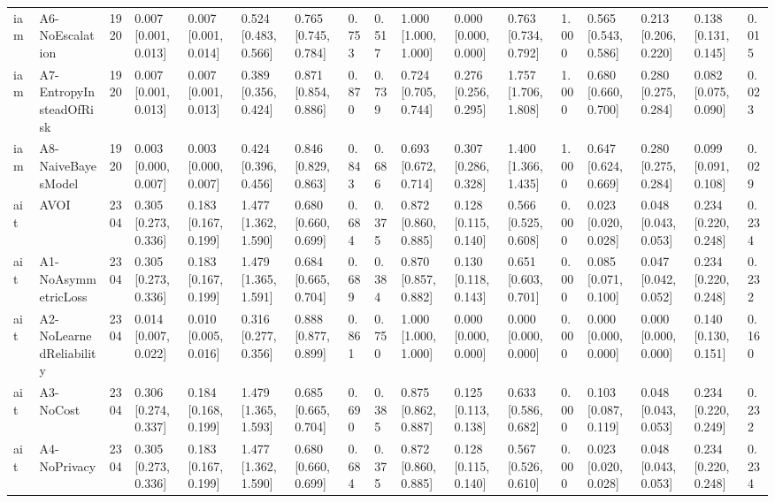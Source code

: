 \begin{table}[!ht]
{\begin{tabular}{lllllllllllllllll}
iam & A6-NoEscalation & 1920 & 0.007 [0.001, 0.013] & 0.007 [0.001, 0.014] & 0.524 [0.483, 0.566] & 0.765 [0.745, 0.784] & 0.753 & 0.517 & 1.000 [1.000, 1.000] & 0.000 [0.000, 0.000] & 0.763 [0.734, 0.792] & 1.000 & 0.565 [0.543, 0.586] & 0.213 [0.206, 0.220] & 0.138 [0.131, 0.145] & 0.015 \\
iam & A7-EntropyInsteadOfRisk & 1920 & 0.007 [0.001, 0.013] & 0.007 [0.001, 0.013] & 0.389 [0.356, 0.424] & 0.871 [0.854, 0.886] & 0.870 & 0.739 & 0.724 [0.705, 0.744] & 0.276 [0.256, 0.295] & 1.757 [1.706, 1.808] & 1.000 & 0.680 [0.660, 0.700] & 0.280 [0.275, 0.284] & 0.082 [0.075, 0.090] & 0.023 \\
iam & A8-NaiveBayesModel & 1920 & 0.003 [0.000, 0.007] & 0.003 [0.000, 0.007] & 0.424 [0.396, 0.456] & 0.846 [0.829, 0.863] & 0.843 & 0.686 & 0.693 [0.672, 0.714] & 0.307 [0.286, 0.328] & 1.400 [1.366, 1.435] & 1.000 & 0.647 [0.624, 0.669] & 0.280 [0.275, 0.284] & 0.099 [0.091, 0.108] & 0.029 \\
ait & AVOI & 2304 & 0.305 [0.273, 0.336] & 0.183 [0.167, 0.199] & 1.477 [1.362, 1.590] & 0.680 [0.660, 0.699] & 0.684 & 0.375 & 0.872 [0.860, 0.885] & 0.128 [0.115, 0.140] & 0.566 [0.525, 0.608] & 0.000 & 0.023 [0.020, 0.028] & 0.048 [0.043, 0.053] & 0.234 [0.220, 0.248] & 0.234 \\
ait & A1-NoAsymmetricLoss & 2304 & 0.305 [0.273, 0.336] & 0.183 [0.167, 0.199] & 1.479 [1.365, 1.591] & 0.684 [0.665, 0.704] & 0.689 & 0.384 & 0.870 [0.857, 0.882] & 0.130 [0.118, 0.143] & 0.651 [0.603, 0.701] & 0.000 & 0.085 [0.071, 0.100] & 0.047 [0.042, 0.052] & 0.234 [0.220, 0.248] & 0.232 \\
ait & A2-NoLearnedReliability & 2304 & 0.014 [0.007, 0.022] & 0.010 [0.005, 0.016] & 0.316 [0.277, 0.356] & 0.888 [0.877, 0.899] & 0.861 & 0.750 & 1.000 [1.000, 1.000] & 0.000 [0.000, 0.000] & 0.000 [0.000, 0.000] & 0.000 & 0.000 [0.000, 0.000] & 0.000 [0.000, 0.000] & 0.140 [0.130, 0.151] & 0.160 \\
ait & A3-NoCost & 2304 & 0.306 [0.274, 0.337] & 0.184 [0.168, 0.199] & 1.479 [1.365, 1.593] & 0.685 [0.665, 0.704] & 0.690 & 0.385 & 0.875 [0.862, 0.887] & 0.125 [0.113, 0.138] & 0.633 [0.586, 0.682] & 0.000 & 0.103 [0.087, 0.119] & 0.048 [0.043, 0.053] & 0.234 [0.220, 0.249] & 0.232 \\
ait & A4-NoPrivacy & 2304 & 0.305 [0.273, 0.336] & 0.183 [0.167, 0.199] & 1.477 [1.362, 1.590] & 0.680 [0.660, 0.699] & 0.684 & 0.375 & 0.872 [0.860, 0.885] & 0.128 [0.115, 0.140] & 0.567 [0.526, 0.610] & 0.000 & 0.023 [0.020, 0.028] & 0.048 [0.043, 0.053] & 0.234 [0.220, 0.248] & 0.234 \\

\end{tabular}}
\end{table}
